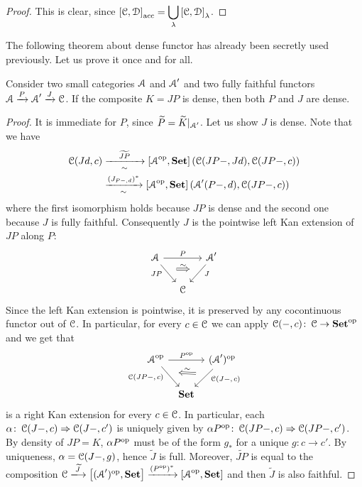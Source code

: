 \documentclass[a4paper,11pt,oneside,openany]{scrbook}
\begin{document}
\begin{proof}
	This is clear, since $\displaystyle\left[\operatorname{\mathcal{C}},\operatorname{\mathcal{D}}\right]_\text{acc}=\bigcup_\lambda\left[\operatorname{\mathcal{C}},\operatorname{\mathcal{D}}\right]_\lambda$.
\end{proof}
The following theorem about dense functor has already been secretly used previously. Let us prove it once and for all.
\begin{thm}
	Consider two small categories $\operatorname{\mathcal{A}}$ and $\operatorname{\mathcal{A}}'$ and two fully faithful functors $\operatorname{\mathcal{A}}\xrightarrow{P}\operatorname{\mathcal{A}}'\xrightarrow{J}\operatorname{\mathcal{C}}$. If the composite $K=JP$ is dense, then both $P$ and $J$ are dense.
\end{thm}
\begin{proof}
	It is immediate for $P$, since $\widetilde{P}=\widetilde{K}|_{\operatorname{\mathcal{A}}'}$. Let us show $J$ is dense. Note that we have
	\begin{align*}
		\operatorname{\mathcal{C}}(Jd,c) & \xrightarrow[\sim]{\hspace*{4mm}\widetilde{JP}\hspace*{4mm}}\left[\operatorname{\mathcal{A}}^{\operatorname{\text{op}}}, {\normalfont\textbf{Set}}\right](\operatorname{\mathcal{C}}(JP-,Jd),\operatorname{\mathcal{C}}(JP-,c)) \\
		         & \xrightarrow[\sim]{(J_{P-,d})^*}\left[\operatorname{\mathcal{A}}^{\operatorname{\text{op}}}, {\normalfont\textbf{Set}}\right](\operatorname{\mathcal{A}}'(P-,d),\operatorname{\mathcal{C}}(JP-,c))
	\end{align*}
	where the first isomorphism holds because $JP$ is dense and the second one because $J$ is fully faithful. Consequently $J$ is the pointwise left Kan extension of $JP$ along $P$:
	\[
		\begin{tikzcd}[column sep=small]
			\A\ar[rr, "P"]\ar[dr, swap, "JP" near start, ""{name=JP, below}]
			&& \A'\ar[dl, "J" near start, ""{name=J, below}] \\
			& \C
			\ar[Rightarrow, shorten <= .6em, shorten >= .6em, shift left=1.5ex, "\sim", from=JP, to=J]
		\end{tikzcd}
	\]
	Since the left Kan extension is pointwise, it is preserved by any cocontinuous functor out of $\operatorname{\mathcal{C}}$. In particular, for every $c\in\operatorname{\mathcal{C}}$ we can apply $\operatorname{\mathcal{C}}(-,c)\colon\operatorname{\mathcal{C}}\to{\normalfont\textbf{Set}}^{\operatorname{\text{op}}}$ and we get that
	\[
		\begin{tikzcd}[column sep=tiny]
			\A^{\op}\ar[rr, "P^{\op}"]\ar[dr, swap, "\C(JP-\text{, }\hspace*{-.5mm}c)"near start, ""{name=JP, below}]
			&& (\A')^{\op}\ar[dl, "\C(J-\text{, }\hspace*{-.5mm} c)" near start, ""{name=J, below}] \\
			& \Set
			\ar[Leftarrow, shorten <= .6em, shorten >= .6em, shift left=1.5ex, "\sim", from=JP, to=J]
		\end{tikzcd}
	\]
	is a right Kan extension for every $c\in\operatorname{\mathcal{C}}$. In particular, each $\alpha\colon\operatorname{\mathcal{C}}(J-,c)\Rightarrow\operatorname{\mathcal{C}}(J-,c')$ is uniquely given by $\alpha P^{\operatorname{\text{op}}}\colon\operatorname{\mathcal{C}}(JP-,c)\Rightarrow\operatorname{\mathcal{C}}(JP-,c')$. By density of $JP=K$, $\alpha P^{\operatorname{\text{op}}}$ must be of the form $g_*$ for a unique $g\colon c\to c'$. By uniqueness, $\alpha=\operatorname{\mathcal{C}}(J-,g)$, hence $\widetilde{J}$ is full. Moreover, $\widetilde{JP}$ is equal to the composition $\C\xlongrightarrow{\widetilde{J}} \left[(\A')^{\op},\Set\right]\xrightarrow{(P^{\op})^*}\left[\A^{\op},\Set\right]$ and then $\widetilde{J}$ is also faithful.
\end{proof}
\end{document}
